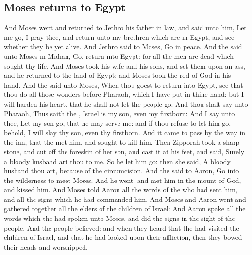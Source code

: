 \begin{biblechapter}
\section*{Moses returns to Egypt}
\verse And Moses went and returned to Jethro his father in law, and said unto him, Let me go, I pray thee, and return unto my brethren which are in Egypt, and see whether they be yet alive. And Jethro said to Moses, Go in peace.
\verse And the \LORD said unto Moses in Midian, Go, return into Egypt: for all the men are dead which sought thy life.
\verse And Moses took his wife and his sons, and set them upon an ass, and he returned to the land of Egypt: and Moses took the rod of God in his hand.
\verse And the \LORD said unto Moses, When thou goest to return into Egypt, see that thou do all those wonders before Pharaoh, which I have put in thine hand: but I will harden his heart, that he shall not let the people go.
\verse And thou shalt say unto Pharaoh, Thus saith the \LORD, Israel is my son, even my firstborn:
\verse And I say unto thee, Let my son go, that he may serve me: and if thou refuse to let him go, behold, I will slay thy son, even thy firstborn.
\verse And it came to pass by the way in the inn, that the \LORD met him, and sought to kill him.
\verse Then Zipporah took a sharp stone, and cut off the foreskin of her son, and cast it at his feet, and said, Surely a bloody husband art thou to me.
\verse So he let him go: then she said, A bloody husband thou art, because of the circumcision.
\verse And the \LORD said to Aaron, Go into the wilderness to meet Moses. And he went, and met him in the mount of God, and kissed him.
\verse And Moses told Aaron all the words of the \LORD who had sent him, and all the signs which he had commanded him.
\verse And Moses and Aaron went and gathered together all the elders of the children of Israel:
\verse And Aaron spake all the words which the \LORD had spoken unto Moses, and did the signs in the sight of the people.
\verse And the people believed: and when they heard that the \LORD had visited the children of Israel, and that he had looked upon their affliction, then they bowed their heads and worshipped.
\end{biblechapter}

